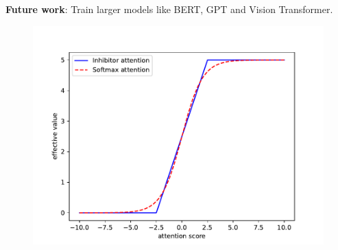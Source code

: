 \documentclass[12pt,oneside]{book}
\begin{document}
\noindent
\textbf{Future work}: Train larger models like BERT, GPT and Vision Transformer.

\begin{figure}[H]
    \centering
    \includegraphics[width=0.8\columnwidth]{attention_comparison.pdf}
\end{figure}


    
\end{document}
